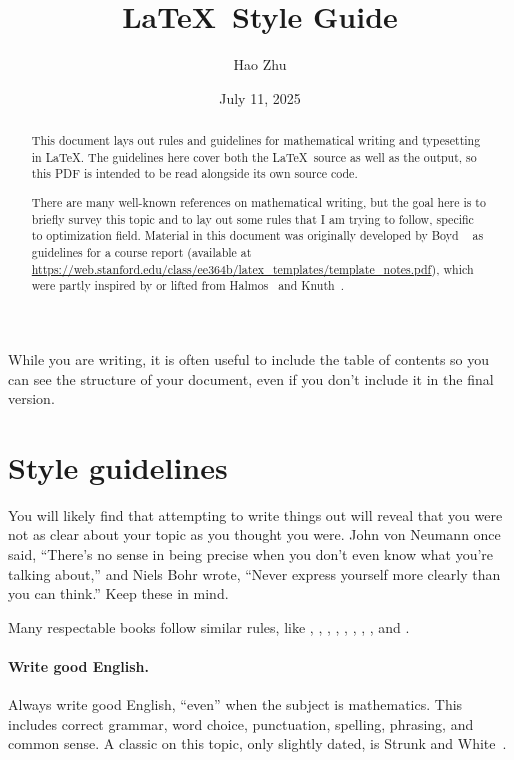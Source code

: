\documentclass{article}
\title{\LaTeX\ Style Guide}
\date{July 11, 2025}
\author{Hao Zhu}
\affil{Department of Computer Science, University of Freiburg}
\begin{document}
\maketitle

\begin{abstract}
This document lays out rules and guidelines for mathematical writing and typesetting in \LaTeX. 
The guidelines here cover both the \LaTeX\ source as well as the output, so this PDF is intended to be read alongside its own source code.

There are many well-known references on mathematical writing, but the goal here is to briefly survey this topic and to lay out some rules that I am trying to follow, specific to optimization field. 
Material in this document was originally developed by Boyd \etal~\cite{boyd2014latex} as guidelines for a course report (available at \url{https://web.stanford.edu/class/ee364b/latex_templates/template_notes.pdf}), which were partly inspired by or lifted from Halmos~\cite{Halmos:1970} and Knuth~\cite{Knuth:1989}.
\end{abstract}

\newpage
\tableofcontents
\newpage

While you are writing, it is often useful to include the table of contents so you can see the structure of your document, even if you don't include it in the final version.

\section{Style guidelines}

You will likely find that attempting to write things out will reveal that you were not as clear about your topic as you thought you were. 
John von Neumann once said, ``There's no sense in being precise when you don't even know what you're talking about,'' and Niels Bohr wrote, ``Never express yourself more clearly than you can think.''
Keep these in mind.

Many respectable books follow similar rules, like
\cite{BoV:04},
\cite[p.~23]{Cover:1991},
\cite[p.~26]{Hastie:2001},
\cite[p.~21]{Sipser:2001},
\cite[p.~25]{Cormen:2001},
\cite[p.~15]{Rudin:1976},
\cite[p.~18]{Evans:2010},
\cite[p.~3]{Goldstein:1980}, and 
\cite{Knuth:1973}.

\paragraph{Write good English.}
Always write good English, ``even'' when the subject is mathematics. 
This includes correct grammar, word choice, punctuation, spelling, phrasing, and common sense. 
A classic on this topic, only slightly dated, is Strunk and White~\cite{SW:59}.
\end{document}
